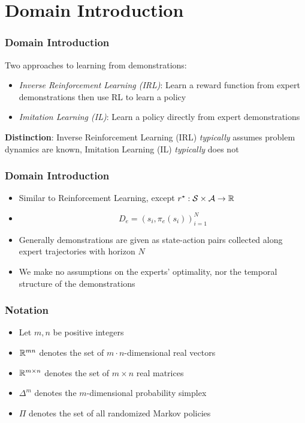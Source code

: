\documentclass{beamer}
\begin{document}
\section*{Domain Introduction}

\begin{frame}
\frametitle{Domain Introduction}
Two approaches to learning from demonstrations:
\begin{itemize}
	\item \emph{Inverse Reinforcement Learning (IRL)}: Learn a reward function from expert demonstrations then use RL to learn a policy
	\item \emph{Imitation Learning (IL)}: Learn a policy directly from expert demonstrations
\end{itemize}
\textbf{Distinction}: Inverse Reinforcement Learning (IRL) \emph{typically} assumes problem dynamics are known, Imitation Learning (IL) \emph{typically} does not
\end{frame}

\begin{frame}
\frametitle{Domain Introduction}
	\begin{itemize}
		\item Similar to Reinforcement Learning, except $r^\star : \mathcal{S} \times \mathcal{A} \to \mathbb{R}$
		\item $$D_e = (s_i, \pi_e(s_i))_{i=1}^N$$
		\item Generally demonstrations are given as state-action pairs collected along expert trajectories with horizon $N$
		\item We make no assumptions on the experts' optimality, nor the temporal structure of the demonstrations
	\end{itemize}
\end{frame}

\begin{frame}
	\frametitle{Notation}
	\begin{itemize}
		\item Let $m, n$ be positive integers
		\item $\mathbb{R}^{mn}$ denotes the set of $m \cdot n$-dimensional real vectors
		\item $\mathbb{R}^{m \times n}$ denotes the set of $m \times n$ real matrices
		\item $\Delta^m$ denotes the $m$-dimensional probability simplex
		\item $\Pi$ denotes the set of all randomized Markov policies
	\end{itemize}
\end{frame}
\end{document}
